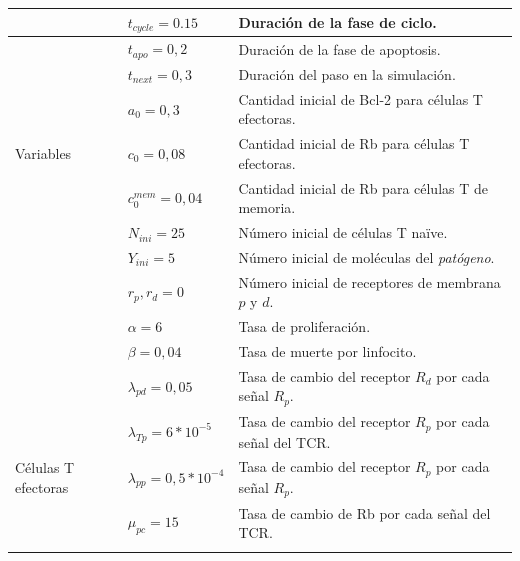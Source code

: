 \begin{table}[h]
	\begin{center}
		\begin{tabular}{>{\centering\arraybackslash}m{2cm} >{\arraybackslash}m{3cm} >{\arraybackslash}m{7cm} }%
			\hline
			\multirow{9}{*}{} & $t_{cycle} = 0.15$               & Duración de la fase de ciclo.                             \\ \cline{2-3}
			& $t_{apo} = 0,2$                  & Duración de la fase de apoptosis.                         \\ \cline{2-3}
			& $t_{next} = 0,3$                 & Duración del paso en la simulación.                       \\ \cline{2-3}
			& $a_0 = 0,3$                      & Cantidad inicial de Bcl-2 para células T efectoras.       \\ \cline{2-3}
			Variables         & $c_0 = 0,08$                     & Cantidad inicial de Rb para células T efectoras.          \\ \cline{2-3}
			& $c_0^{mem} = 0,04$               & Cantidad inicial de Rb para células T de memoria.         \\ \cline{2-3}
			& $N_{ini} = 25$                   & Número inicial de células T naïve.                        \\ \cline{2-3}
			& $Y_{ini} = 5$                    & Número inicial de moléculas del \textit{patógeno}.                 \\ \cline{2-3}
			& $r_p, r_d = 0$                   & Número inicial de receptores de membrana $p$ y $d$.       \\ \hline
			\multirow{2}{*}{Patógeno}  & $\alpha = 6$                    & Tasa de proliferación.                                    \\ \cline{2-3}
			& $\beta = 0,04$                    & Tasa de muerte por linfocito.                             \\ \hline
			\multirow{5}{*}{} & $\lambda_{pd} = 0,05$            & Tasa de cambio del receptor $R_d$ por cada señal $R_p$.   \\ \cline{2-3}
			& $\lambda_{Tp} = 6*10^{-5}$       & Tasa de cambio del receptor $R_p$ por cada señal del TCR. \\ \cline{2-3}
			Células T  efectoras       & $\lambda_{pp} = 0,5*10^{-4}$     & Tasa de cambio del receptor $R_p$ por cada señal $R_p$.   \\ \cline{2-3}
			& $\mu_{pc} = 15$                 & Tasa de cambio de Rb por cada señal del TCR.              \\ \cline{2-3}

\end{tabular}
\end{center}
\end{table}
